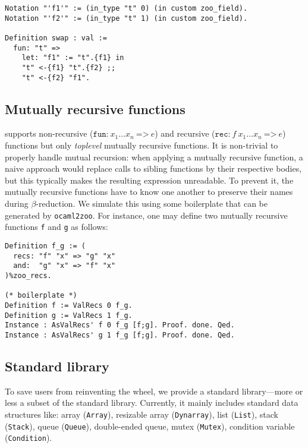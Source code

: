 \begin{verbatim}
Notation "'f1'" := (in_type "t" 0) (in custom zoo_field).
Notation "'f2'" := (in_type "t" 1) (in custom zoo_field).

Definition swap : val :=
  fun: "t" =>
    let: "f1" := "t".{f1} in
    "t" <-{f1} "t".{f2} ;;
    "t" <-{f2} "f1".
\end{verbatim}

\subsection{Mutually recursive functions}

\Zoo supports non-recursive ($\texttt{fun:}\ x_1 \dots x_n\ \texttt{=>}\ e$) and recursive ($\texttt{rec:}\ f\ x_1 \dots x_n\ \texttt{=>}\ e$) functions but only \emph{toplevel} mutually recursive functions.
It is non-trivial to properly handle mutual recursion: when applying a mutually recursive function, a naive approach would replace calls to sibling functions by their respective bodies, but this typically makes the resulting expression unreadable.
To prevent it, the mutually recursive functions have to know one another to preserve their names during $\beta$-reduction.
We simulate this using some boilerplate that can be generated by \texttt{ocaml2zoo}.
For instance, one may define two mutually recursive functions \texttt{f} and \texttt{g} as follows:

\begin{verbatim}
Definition f_g := (
  recs: "f" "x" => "g" "x"
  and:  "g" "x" => "f" "x"
)%zoo_recs.

(* boilerplate *)
Definition f := ValRecs 0 f_g.
Definition g := ValRecs 1 f_g.
Instance : AsValRecs' f 0 f_g [f;g]. Proof. done. Qed.
Instance : AsValRecs' g 1 f_g [f;g]. Proof. done. Qed.
\end{verbatim}

\subsection{Standard library}

To save users from reinventing the wheel, we provide a standard library---more or less a subset of the \OCaml standard library.
Currently, it mainly includes standard data structures like: array (\texttt{Array}), resizable array (\texttt{Dynarray}), list (\texttt{List}), stack (\texttt{Stack}), queue (\texttt{Queue}), double-ended queue, mutex (\texttt{Mutex}), condition variable (\texttt{Condition}).

